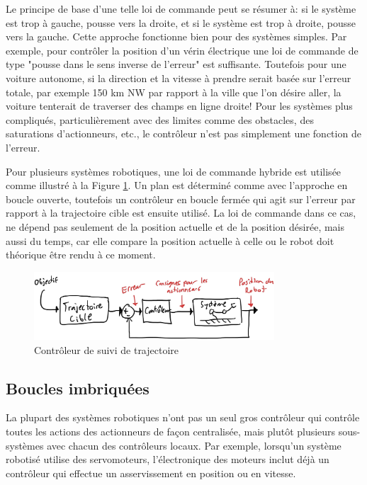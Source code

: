 Le principe de base d'une telle loi de commande peut se résumer à: si le système est trop à gauche, pousse vers la droite, et si le système est trop à droite, pousse vers la gauche. Cette approche fonctionne bien pour des systèmes simples. Par exemple, pour contrôler la position d'un vérin électrique une loi de commande de type "pousse dans le sens inverse de l'erreur" est suffisante. Toutefois pour une voiture autonome, si la direction et la vitesse à prendre serait basée sur l'erreur totale, par exemple 150 km NW par rapport à la ville que l'on désire aller, la voiture tenterait de traverser des champs en ligne droite! Pour les systèmes plus compliqués, particulièrement avec des limites comme des obstacles, des saturations d'actionneurs, etc., le contrôleur n'est pas simplement une fonction de l'erreur.

Pour plusieurs systèmes robotiques, une loi de commande hybride est utilisée comme illustré à la Figure \ref{fig:trajectoryfollowingcontroller}. Un plan est déterminé comme avec l'approche en boucle ouverte, toutefois un contrôleur en boucle fermée qui agit sur l'erreur par rapport à la trajectoire cible est ensuite utilisé. La loi de commande dans ce cas, ne dépend pas seulement de la position actuelle et de la position désirée, mais aussi du temps, car elle compare la position actuelle à celle ou le robot doit théorique être rendu à ce moment.
\begin{figure}[htbp]
	\centering
	\includegraphics[width=0.8\textwidth]{fig/trajectoryfollowingcontroller.jpg}
	\caption{Contrôleur de suivi de trajectoire}
	\label{fig:trajectoryfollowingcontroller}
\end{figure}



\subsection{Boucles imbriquées}

La plupart des systèmes robotiques n'ont pas un seul gros contrôleur qui contrôle toutes les actions des actionneurs de façon centralisée, mais plutôt plusieurs sous-systèmes avec chacun des contrôleurs locaux. Par exemple, lorsqu'un système robotisé utilise des servomoteurs, l'électronique des moteurs inclut déjà un contrôleur qui effectue un asservissement en position ou en vitesse.

